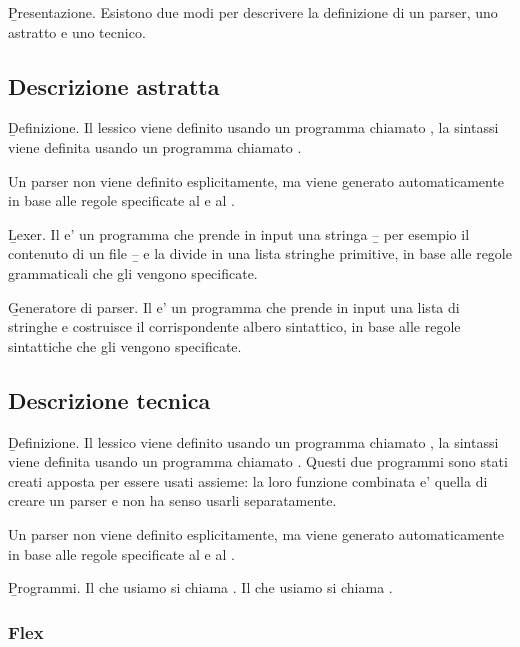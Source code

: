 \b{Presentazione}. Esistono due modi per descrivere la definizione di un parser, uno astratto e uno tecnico.

\subsection{Descrizione astratta}

\b{Definizione}. Il lessico viene definito usando un programma chiamato , la sintassi viene definita usando un programma chiamato .

\skipline

Un parser non viene definito esplicitamente, ma viene generato automaticamente in base alle regole specificate al  e al .

\skipline

\b{Lexer}. Il  e' un programma che prende in input una stringa \b{--} per esempio il contenuto di un file \b{--} e la divide in una lista stringhe primitive, in base alle regole grammaticali che gli vengono specificate.

\skipline

\b{Generatore di parser}. Il  e' un programma che prende in input una lista di stringhe e costruisce il corrispondente albero sintattico, in base alle regole sintattiche che gli vengono specificate.

\subsection{Descrizione tecnica}

\b{Definizione}. Il lessico viene definito usando un programma chiamato , la sintassi viene definita usando un programma chiamato . Questi due programmi sono stati creati apposta per essere usati assieme: la loro funzione combinata e' quella di creare un parser e non ha senso usarli separatamente.

\skipline

Un parser non viene definito esplicitamente, ma viene generato automaticamente in base alle regole specificate al  e al .

\skipline

\b{Programmi}. Il  che usiamo si chiama . Il  che usiamo si chiama .

\subsubsection{Flex}

